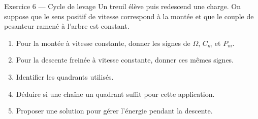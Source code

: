 \begin{TLExercise}{Exercice 6 — Cycle de levage}
Un treuil élève puis redescend une charge. On suppose que le sens positif de vitesse
correspond à la montée et que le couple de pesanteur ramené à l'arbre est constant.
\begin{enumerate}
  \item Pour la montée à vitesse constante, donner les signes de $\Omega$, $C_m$ et $P_m$.
  \item Pour la descente freinée à vitesse constante, donner ces mêmes signes.
  \item Identifier les quadrants utilisés.
  \item Déduire si une chaîne un quadrant suffit pour cette application.
  \item Proposer une solution pour gérer l'énergie pendant la descente.
\end{enumerate}
\end{TLExercise}
